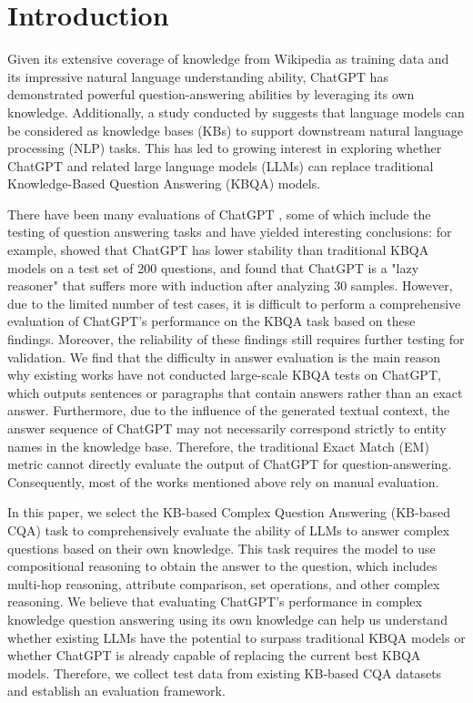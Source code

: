 \documentclass[runningheads]{llncs}
\begin{document}
\section{Introduction}
Given its extensive coverage of knowledge from Wikipedia as training data and its impressive natural language understanding ability, ChatGPT has demonstrated powerful question-answering abilities by leveraging its own knowledge. Additionally, a study conducted by \cite{petroni2019language} suggests that language models can be considered as knowledge bases (KBs) to support downstream natural language processing (NLP) tasks. This has led to growing interest in exploring whether ChatGPT and related large language models (LLMs) can replace traditional Knowledge-Based Question Answering (KBQA) models.

There have been many evaluations of ChatGPT \cite{zhong2023can,kocon2023chatgpt,chen2023robust,zhuo2023exploring,huang2023chatgpt,omar2023chatgpt,wang2023can,wang2023cross,qin2023chatgpt,bang2023multitask}, some of which include the testing of question answering tasks and have yielded interesting conclusions: 
for example, \cite{omar2023chatgpt}  showed that ChatGPT has lower stability than traditional KBQA models on a test set of 200 questions, and \cite{bang2023multitask} found that ChatGPT is a "lazy reasoner" that suffers more with induction after analyzing 30 samples. However, due to the limited number of test cases, it is difficult to perform a comprehensive evaluation of ChatGPT’s performance on the KBQA task based on these findings. Moreover, the reliability of these findings still requires further testing for validation. We find that the difficulty in answer evaluation is the main reason why existing works have not conducted large-scale KBQA tests on ChatGPT, which outputs sentences or paragraphs that contain answers rather than an exact answer. Furthermore, due to the influence of the generated textual context, the answer sequence of ChatGPT may not necessarily correspond strictly to entity names in the knowledge base. Therefore, the traditional Exact Match (EM) metric cannot directly evaluate the output of ChatGPT for question-answering. Consequently, most of the works mentioned above rely on manual evaluation.

In this paper, we select the KB-based Complex Question Answering (KB-based CQA) task to comprehensively evaluate the ability of LLMs to answer complex questions based on their own knowledge. This task requires the model to use compositional reasoning to obtain the answer to the question, which includes multi-hop reasoning, attribute comparison, set operations, and other complex reasoning. We believe that evaluating ChatGPT’s performance in complex knowledge question answering using its own knowledge can help us understand whether existing LLMs have the potential to surpass traditional KBQA models or whether ChatGPT is already capable of replacing the current best KBQA models. Therefore, we collect test data from existing KB-based CQA datasets and establish an evaluation framework.
\end{document}
